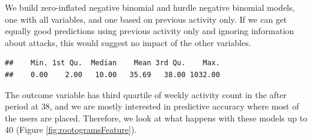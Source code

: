 \documentclass[10pt,]{scrartcl}
\newenvironment{Shaded}{\begin{snugshade}}{\end{snugshade}}
\newcommand{\KeywordTok}[1]{\textcolor[rgb]{0.13,0.29,0.53}{\textbf{#1}}}
\newcommand{\DataTypeTok}[1]{\textcolor[rgb]{0.13,0.29,0.53}{#1}}
\newcommand{\StringTok}[1]{\textcolor[rgb]{0.31,0.60,0.02}{#1}}
\newcommand{\CommentTok}[1]{\textcolor[rgb]{0.56,0.35,0.01}{\textit{#1}}}
\newcommand{\OperatorTok}[1]{\textcolor[rgb]{0.81,0.36,0.00}{\textbf{#1}}}
\newcommand{\NormalTok}[1]{#1}
\begin{document}
\normalsize

We build zero-inflated negative binomial and hurdle negative binomial
models, one with all variables, and one based on previous activity only.
If we can get equally good predictions using previous activity only and
ignoring information about attacks, this would suggest no impact of the
other variables.

\footnotesize 

\begin{Shaded}
\end{Shaded}

\begin{verbatim}
##    Min. 1st Qu.  Median    Mean 3rd Qu.    Max. 
##    0.00    2.00   10.00   35.69   38.00 1032.00
\end{verbatim}

\normalsize

The outcome variable has third quartile of weekly activity count in the
\textsf{after} period at 38, and we are mostly interested in predictive
accuracy where most of the users are placed. Therefore, we look at what
happens with these models up to 40 (Figure \ref{fig:rootogramsFeature}).

\footnotesize

\normalsize
\end{document}

